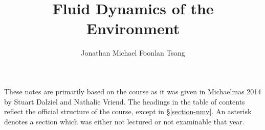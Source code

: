 \documentclass{article}
\title{Fluid Dynamics of the Environment}
\author{Jonathan Michael Foonlan Tsang}
\numberwithin{equation}{section}
\begin{document}
\maketitle

These notes are primarily based on the course as it was given in Michaelmas 2014 by Stuart Dalziel and Nathalie Vriend. The headings in the table of contents reflect the official structure of the course, except in \S\ref{section-nmv}. An asterisk denotes a section which was either not lectured or not examinable that year. 

\tableofcontents










\end{document}
